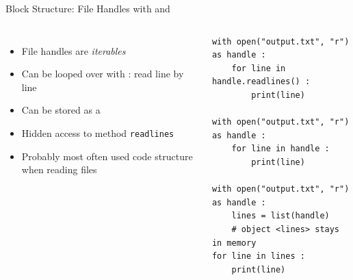 \begin{frame}[fragile]{Block Structure: File Handles with  and }
%
\begin{columns}[t]
\begin{itemize}
\item File handles are \emph{iterables}
\item Can be looped over with : read line by line
\item Can be stored as a  
\item Hidden access to method \texttt{readlines}
\item Probably most often used code structure when reading files
\end{itemize}
%
\begin{codebox}
\begin{verbatim}
with open("output.txt", "r") as handle :
    for line in handle.readlines() :
        print(line)

with open("output.txt", "r") as handle :
    for line in handle :
        print(line)

with open("output.txt", "r") as handle :
    lines = list(handle)
    # object <lines> stays in memory
for line in lines :
    print(line)
\end{verbatim}
\end{codebox}
%
\end{columns}
%
\end{frame}



